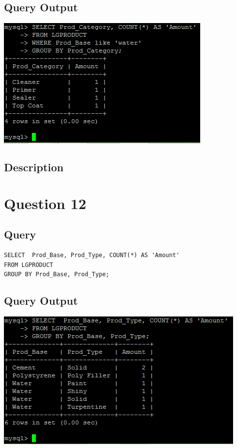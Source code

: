 \documentclass[a4paper,10pt]{article}
\begin{document}
\subsection{Query Output}
           \includegraphics{Queries/Question_11/Question_11_screenshot.PNG}
\subsection{Description}
\section*{Question 12}
 \subsection{Query}
          \lstset{
            language=SQL,
            breaklines=true
            }
        \begin{lstlisting}[frame=single]
        SELECT  Prod_Base, Prod_Type, COUNT(*) AS 'Amount'
FROM LGPRODUCT
GROUP BY Prod_Base, Prod_Type;

        \end{lstlisting}
\subsection{Query Output}
           \includegraphics{Queries/Question_12/Question_12_Screenshot.PNG}
\end{document}
